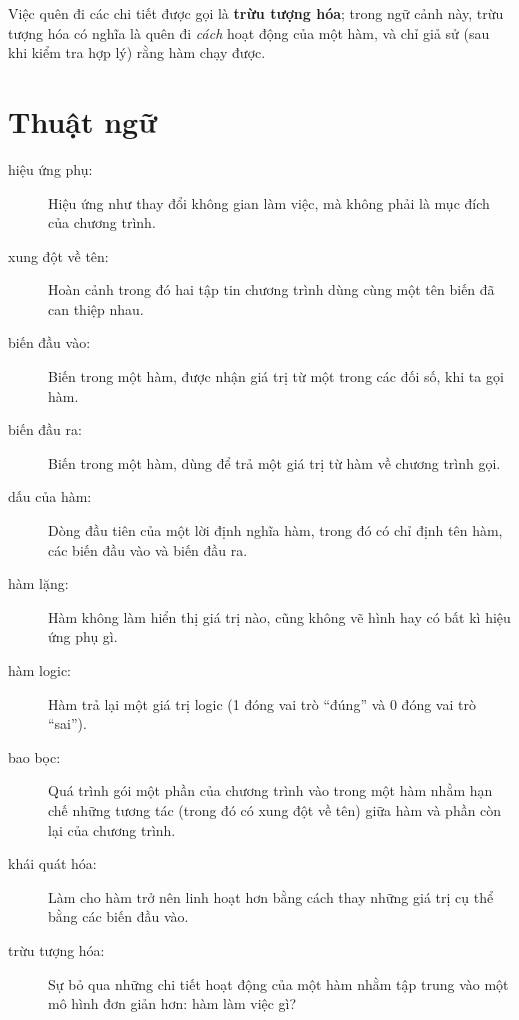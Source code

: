 \documentclass[12pt]{book}
\begin{document}
Việc quên đi các chi tiết được gọi là {\bf trừu tượng hóa};
trong ngữ cảnh này, trừu tượng hóa có nghĩa là quên đi {\em cách} 
hoạt động của một hàm, và chỉ giả sử (sau khi kiểm tra hợp lý)
rằng hàm chạy được.


\section{Thuật ngữ}

\begin{description}

\item[hiệu ứng phụ:] Hiệu ứng như thay đổi không gian làm việc,
mà không phải là mục đích của chương trình.

\item[xung đột về tên:] Hoàn cảnh trong đó hai tập tin chương trình
dùng cùng một tên biến đã can thiệp nhau.

\item[biến đầu vào:] Biến trong một hàm, được nhận giá trị 
từ một trong các đối số, khi ta gọi hàm.

\item[biến đầu ra:] Biến trong một hàm, dùng để trả một giá trị
từ hàm về chương trình gọi.

\item[dấu của hàm:] Dòng đầu tiên của một lời định nghĩa hàm,
trong đó có chỉ định tên hàm, các biến đầu vào và biến đầu ra.

\item[hàm lặng:] Hàm không làm hiển thị giá trị nào, cũng không
vẽ hình hay có bất kì hiệu ứng phụ gì.

\item[hàm logic:] Hàm trả lại một giá trị logic (1 đóng vai trò ``đúng''
và 0 đóng vai trò ``sai'').

\item[bao bọc:] Quá trình gói một phần của chương trình vào trong
một hàm nhằm hạn chế những tương tác (trong đó có xung đột về tên)
giữa hàm và phần còn lại của chương trình.

\item[khái quát hóa:] Làm cho hàm trở nên linh hoạt hơn bằng cách
thay những giá trị cụ thể bằng các biến đầu vào.

\item[trừu tượng hóa:] Sự bỏ qua những chi tiết hoạt động của một hàm
nhằm tập trung vào một mô hình đơn giản hơn: hàm làm việc gì?

\end{description}
\end{document}
